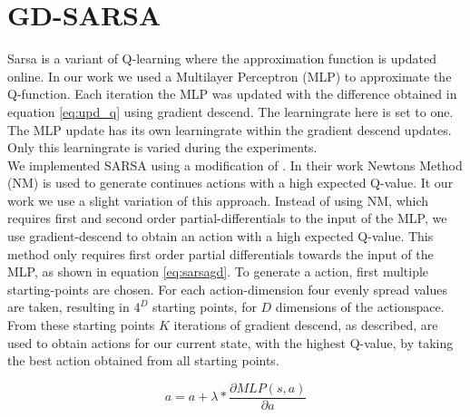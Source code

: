 
\section{GD-SARSA}
Sarsa is a variant of Q-learning where the approximation function is updated online. In our work we used a Multilayer Perceptron (MLP) to approximate the Q-function. Each iteration the MLP was updated with the difference obtained in equation \eqref{eq:upd_q} using gradient descend. The learningrate here is set to one. The MLP update has its own learningrate within the gradient descend updates. Only this learningrate is varied during the experiments. \\
\newline
We implemented SARSA using a modification of \cite{nichols2015continuous}. In their work Newtons Method (NM) is used to generate continues actions with a high expected Q-value.
It our work we use a slight variation of this approach. Instead of using NM, which requires first and second order partial-differentials to the input of the MLP, we use gradient-descend to obtain an action with a high expected Q-value. This method only requires first order partial differentials towards the input of the MLP, as shown in equation \eqref{eq:sarsagd}.
To generate a action, first multiple starting-points are chosen. For each action-dimension four evenly spread values are taken, resulting in $4 ^ D$ starting points, for $D$ dimensions of the actionspace. From these starting points $K$ iterations of gradient descend, as described, are used to obtain actions for our current state, with the highest Q-value, by taking the best action obtained from all starting points.


\begin{equation}
\label{eq:sarsagd}
a = a + \lambda * \frac{\partial MLP(s,a)}{\partial a}
\end{equation}

